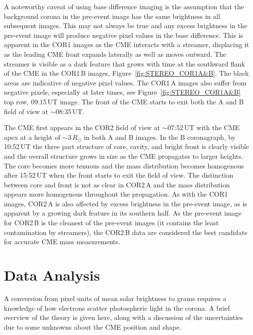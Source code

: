A noteworthy caveat of using base difference imaging is the assumption that the background corona in the pre-event image has the same brightness in all subsequent images. This may not always be true and any excess brightness in the pre-event image will produce negative pixel values in the base difference. This is apparent in the COR1 images as the CME interacts with a streamer, displacing it as the leading CME front expands laterally as well as moves outward. The streamer is visible as a dark feature that grows with time at the southward flank of the CME in the COR1\,B images, Figure~\ref{fig:STEREO_COR1A&B}. The black areas are indicative of negative pixel values. The COR1\,A images also suffer from negative pixels, especially at later times, see Figure~\ref{fig:STEREO_COR1A&B} top row, 09:15\,UT image. 
The front of the CME starts to exit both the A and B field of view at $\sim$08:35\,UT.

The CME first appears in the COR2 field of view at $\sim$07:52\,UT with the CME apex at a height of $\sim$3\,$R_{\odot}$ in both A and B images. In the B coronagraph, by 10:52\,UT the three part structure of core, cavity, and bright front is clearly visible and the overall structure grows in size as the CME propagates to larger heights. The core becomes more tenuous and the mass distribution becomes homogenous after 15:52\,UT when the front starts to exit the field of view. The distinction between core and front is not as clear in COR2\,A and the mass distribution appears more homogenous throughout the propagation. As with the COR1 images, COR2\,A is also affected by excess brightness in the pre-event image, as is apparent by a growing dark feature in its southern half. As the pre-event image for COR2\,B is the cleanest of the pre-event images (it contains the least contamination by streamers), the COR2\,B data are considered the best candidate for accurate CME mass measurements. 



\section{Data Analysis}\label{sec:10}

A conversion from pixel units of mean solar brightness to grams requires a knowledge of how electrons scatter photospheric light in the corona. A brief overview of the theory is given here, along with a discussion of the uncertainties due to some unknowns about the CME position and shape.


